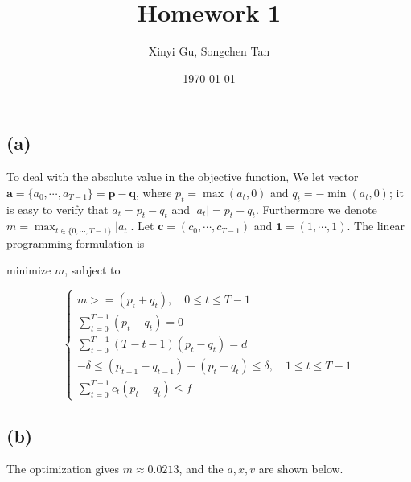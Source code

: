 \documentclass{article}
\title{Homework 1}
\author{Xinyi Gu, Songchen Tan}
\date{\today}
\renewcommand{\a}{\bm a}
\renewcommand{\c}{\bm c}
\newcommand{\p}{\bm p}
\newcommand{\q}{\bm q}
\newcommand{\1}{\bm 1}
\begin{document}
\maketitle
\section{}
\subsection*{(a)}

To deal with the absolute value in the objective function, We let vector $\a=\{a_0,\cdots,a_{T-1}\}=\p-\q$, where $p_t=\max(a_t,0)$ and $q_t=-\min(a_t,0)$; it is easy to verify that $a_t=p_t-q_t$ and $|a_t|=p_t+q_t$. Furthermore we denote $m=\max_{t\in\{0,\cdots,T-1\}}|a_t|$. Let $\c=(c_0,\cdots,c_{T-1})$ and $\1=(1,\cdots,1)$. The linear programming formulation is

minimize $m$, subject to

$$
\begin{cases}
    m >= (p_t + q_t), \quad 0\le t\le T-1\\
    \displaystyle
    \sum_{t=0}^{T-1}(p_t - q_t)=0\\
    \displaystyle
    \sum_{t=0}^{T-1}(T-t-1)(p_t - q_t)=d\\
    -\delta \le (p_{t-1} - q_{t-1})-(p_t - q_t) \le\delta, \quad 1\le t\le T-1\\
    \displaystyle
    \sum_{t=0}^{T-1}c_t(p_t+q_t)\le f
\end{cases}
$$

\subsection*{(b)}

The optimization gives $m\approx 0.0213$, and the $a, x, v$ are shown below.
\end{document}

